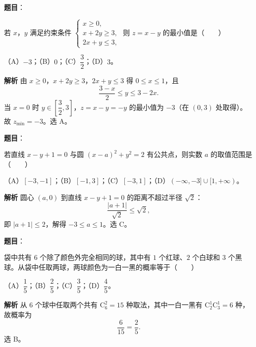 \begin{answer}

\textbf{题目}：

若 $x$，$y$ 满足约束条件 $\begin{cases}x\geqslant0,\\x+2y\geqslant3,\\2x+y\leqslant3,\end{cases}$ 则 $z=x-y$ 的最小值是\mbox{（　　）}

（A）$-3$；（B）$0$；（C）$\dfrac32$；（D）$3$。

\textbf{解析}
由 $x\geqslant0$，$x+2y\geqslant3$，$2x+y\leqslant3$ 得 $0\leqslant x\leqslant1$，且
\nopagebreak[4]
\[\frac{3-x}2\leqslant y\leqslant3-2x.\]
当 $x=0$ 时 $y\in\left[\dfrac32,3\right]$，$z=x-y=-y$ 的最小值为 $-3$（在 $(0,3)$ 处取得）。故 $z_{\min}=-3$。选 A。


\end{answer}
\begin{answer}

\textbf{题目}：

若直线 $x-y+1=0$ 与圆 $(x-a)^2+y^2=2$ 有公共点，则实数 $a$ 的取值范围是\mbox{（　　）}

（A）$[-3,-1]$；（B）$[-1,3]$；（C）$[-3,1]$；（D）$(-\infty,-3]\cup[1,+\infty)$。

\textbf{解析}
圆心 $(a,0)$ 到直线 $x-y+1=0$ 的距离不超过半径 $\sqrt2$：
\nopagebreak[4]
\[\frac{|a+1|}{\sqrt2}\leqslant\sqrt2,\]
即 $|a+1|\leqslant2$，解得 $-3\leqslant a\leqslant1$。选 C。


\end{answer}
\begin{answer}

\textbf{题目}：

袋中共有 $6$ 个除了颜色外完全相同的球，其中有 $1$ 个红球、$2$ 个白球和 $3$ 个黑球。从袋中任取两球，两球颜色为一白一黑的概率等于\mbox{（　　）}

（A）$\dfrac15$；（B）$\dfrac25$；（C）$\dfrac35$；（D）$\dfrac45$。

\textbf{解析}
从 $6$ 个球中任取两个共有 $\mathrm C_6^2=15$ 种取法，其中一白一黑有 $\mathrm C_2^1\mathrm C_3^1=6$ 种，故概率为
\nopagebreak[4]
\[\frac6{15}=\frac25.\]
选 B。


\end{answer}
